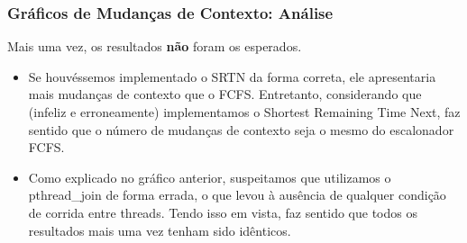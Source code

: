 \documentclass{beamer}
\begin{document}
\begin{frame}
\frametitle{Gráficos de Mudanças de Contexto: Análise}

Mais uma vez, os resultados \textbf{não} foram os esperados.

\begin{itemize}
\item Se houvéssemos implementado o SRTN da forma correta, ele apresentaria mais mudanças de contexto que o FCFS. Entretanto, considerando que (infeliz e erroneamente) implementamos o Shortest Remaining Time Next, faz sentido que o número de mudanças de contexto seja o mesmo do escalonador FCFS.

\item Como explicado no gráfico anterior, suspeitamos que utilizamos o pthread\_join de forma errada, o que levou à ausência de qualquer condição de corrida entre threads. Tendo isso em vista, faz sentido que todos os resultados mais uma vez tenham sido idênticos.

\end{itemize}

\end{frame}
\end{document}

